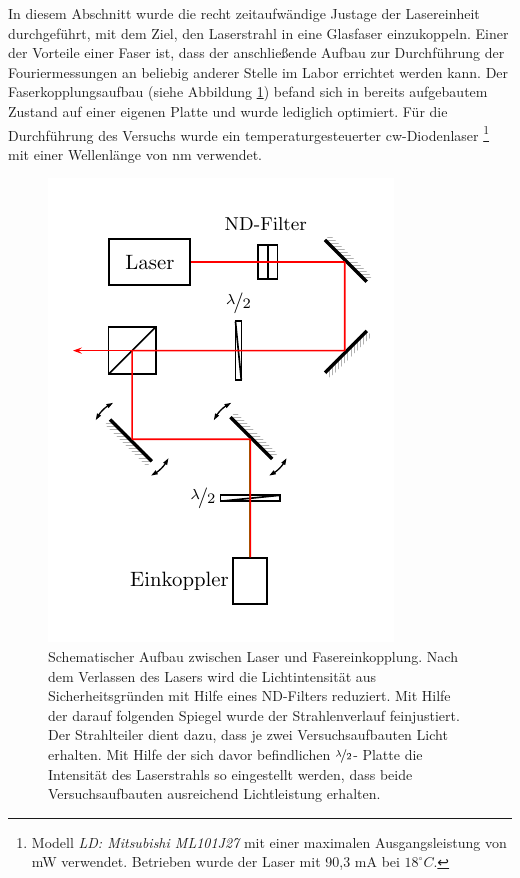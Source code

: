 
In diesem Abschnitt wurde die recht zeitaufwändige Justage der Lasereinheit durchgeführt, mit dem Ziel, den Laserstrahl in eine Glasfaser einzukoppeln. Einer der Vorteile einer Faser ist, dass der anschließende Aufbau zur Durchführung der Fouriermessungen an beliebig anderer Stelle im Labor errichtet werden kann. 
Der Faserkopplungsaufbau (siehe Abbildung \ref{fig:lasereinheit}) befand sich in bereits aufgebautem Zustand auf einer eigenen Platte und wurde lediglich optimiert. Für die Durchführung des Versuchs wurde ein temperaturgesteuerter cw-Diodenlaser \footnote{Modell  \textit{LD: Mitsubishi ML101J27} mit einer maximalen Ausgangsleistung von \unit[35]{mW} verwendet. Betrieben wurde der Laser mit 90,3 mA bei $18^\circ C$.} mit einer Wellenlänge von \unit[660]{nm} verwendet.

\begin{figure}[h]
	\centering
	\includegraphics[width=0.5\linewidth]{graphs/versuchsaufbau/lasereinheit.pdf}
	\caption[Schematischer Aufbau Lasereinheit]{
		Schematischer Aufbau zwischen Laser und Fasereinkopplung. Nach dem Verlassen des Lasers wird die Lichtintensität aus Sicherheitsgründen mit Hilfe eines ND-Filters reduziert. Mit Hilfe der darauf folgenden Spiegel wurde der Strahlenverlauf feinjustiert. Der Strahlteiler dient dazu, dass je zwei Versuchsaufbauten Licht erhalten. Mit Hilfe der sich davor befindlichen $\nicefrac{\lambda}{2}$- Platte die Intensität des Laserstrahls so eingestellt werden, dass beide Versuchsaufbauten ausreichend Lichtleistung erhalten. 
	}
	\label{fig:lasereinheit}
\end{figure}

